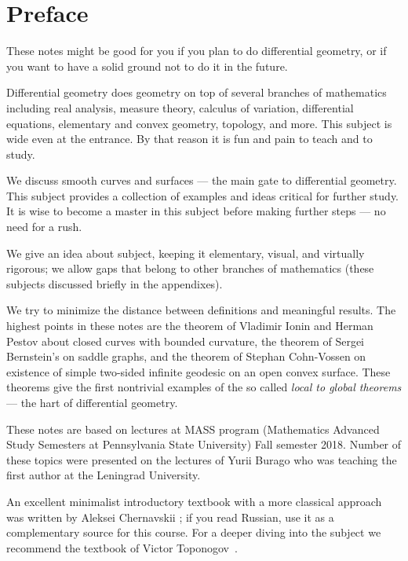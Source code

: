 
\chapter*{Preface}

These notes might be good for you if you plan to do differential geometry,
or if you want to have a solid ground not to do it in the future.

Differential geometry does geometry on top of several branches of mathematics including 
real analysis, 
measure theory,
calculus of variation,
differential equations,
elementary and convex geometry,
topology, and more.
This subject is wide even at the entrance. 
By that reason it is fun and pain to teach and to study.

We discuss smooth curves and surfaces --- the main gate to differential geometry.
This subject provides a collection of examples and ideas critical for further study.
It is wise to become a master in this subject before making further steps --- no need for a rush.

We give an idea about subject, keeping it elementary, visual, and virtually rigorous; we allow gaps that belong to other branches of mathematics (these subjects discussed briefly in the appendixes).

We try to minimize the distance between definitions and meaningful results.
The highest points in these notes are
the theorem of Vladimir Ionin and Herman Pestov about closed curves with bounded curvature,
the theorem of Sergei Bernstein's on saddle graphs,
and the theorem of Stephan Cohn-Vossen on existence of simple two-sided infinite geodesic on an open convex surface.
These theorems give the first nontrivial examples of the so called {}\emph{local to global theorems} --- the hart of differential geometry. 

These notes are based on lectures at MASS program (Mathematics Advanced Study Semesters at Pennsylvania State University) Fall semester 2018.
Number of these topics were presented on the lectures of Yurii Burago who was teaching the first author at the Leningrad University.

An excellent minimalist introductory textbook with a more classical approach was written by Aleksei Chernavskii \cite{chernavsky};
if you read Russian, use it as a complementary source for this course. 
For a deeper diving into the subject we recommend the textbook of Victor Toponogov~\cite{toponogov}.


\newpage
\tableofcontents
